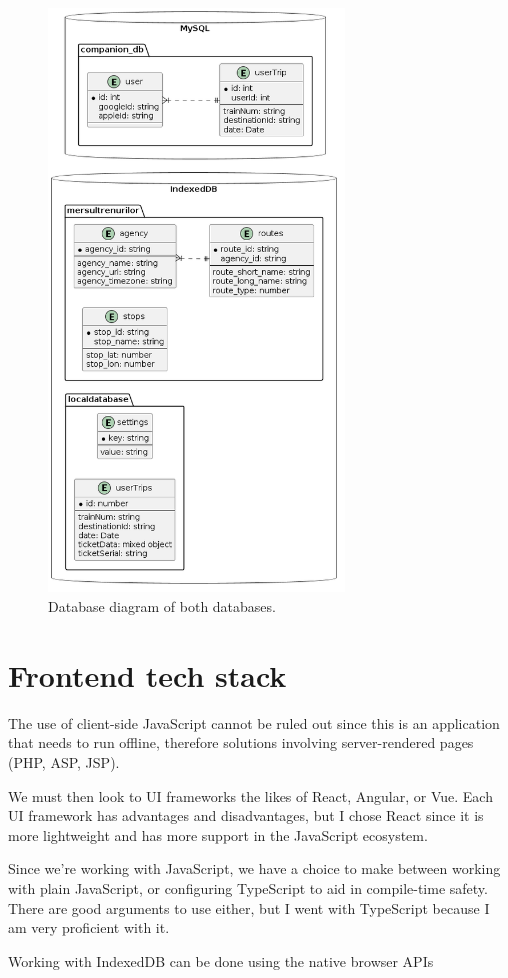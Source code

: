 \begin{figure}[htbp]
    \centering
    \includegraphics[width=0.7\textwidth]{./figures/ch4_db-diagram.png}
    \caption{Database diagram of both databases.}
    \label{FigDbDiagram}
\end{figure}

\section{Frontend tech stack}
The use of client-side JavaScript cannot be ruled out since this is an application that needs to run offline, therefore solutions involving server-rendered pages (PHP, ASP, JSP).

We must then look to UI frameworks the likes of React, Angular, or Vue. Each UI framework has advantages and disadvantages, but I chose React since it is more lightweight and has more support in the JavaScript ecosystem.

Since we're working with JavaScript, we have a choice to make between working with plain JavaScript, or configuring TypeScript to aid in compile-time safety. There are good arguments to use either, but I went with TypeScript because I am very proficient with it.

Working with IndexedDB can be done using the native browser APIs